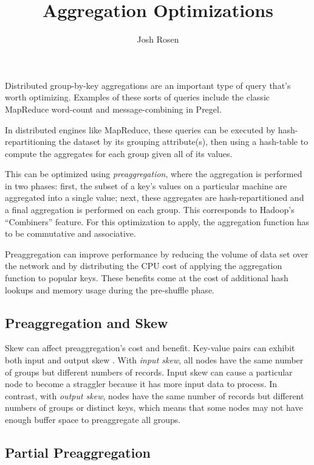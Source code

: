 \documentclass[12pt]{article}
\title{Aggregation Optimizations}
\author{Josh Rosen}
\begin{document}
\maketitle

Distributed group-by-key aggregations are an important type of query that's worth optimizing.
Examples of these sorts of queries include the classic MapReduce word-count and message-combining in Pregel.

In distributed engines like MapReduce, these queries can be executed by hash-repartitioning the dataset by its grouping attribute(s), then using a hash-table to compute the aggregates for each group given all of its values.

This can be optimized using \emph{preaggregation}, where the aggregation is performed in two phases: first, the subset of a key's values on a particular machine are aggregated into a single value; next, these aggregates are hash-repartitioned and a final aggregation is performed on each group.
This corresponds to Hadoop's ``Combiners'' feature.
For this optimization to apply, the aggregation function has to be commutative and associative.

Preaggregation can improve performance by reducing the volume of data set over the network and by distributing the CPU cost of applying the aggregation function to popular keys.
These benefits come at the cost of additional hash lookups and memory usage during the pre-shuffle phase.

\subsection{Preaggregation and Skew}

Skew can affect preaggregation's cost and benefit.  Key-value pairs can exhibit both input and output skew \cite{adaptive-aggregation}.
With \emph{input skew}, all nodes have the same number of groups but different numbers of records.  Input skew can cause a particular node to become a straggler because it has more input data to process.  In contrast, with \emph{output skew}, nodes have the same number of records but different numbers of groups or distinct keys, which means that some nodes may not have enough buffer space to preaggregate all groups.

\subsection{Partial Preaggregation}
\end{document}
